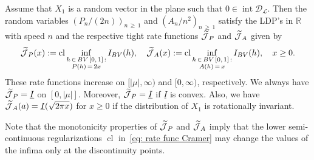 \documentclass[AHL,Unicode,published]{cedram}
\DeclareMathOperator{\cl}{cl}
\DeclareMathOperator{\intr}{int}
\newcommand{\ubar}[1]{\underline{#1}}
\newcommand{\Rbb}{\mathbb{R}}
\newcommand{\Dcl}{\mathcal{D}}
\newcommand{\Lcl}{\mathcal{L}}
\newcommand{\Jcl}{\mathcal{J}}
\let\oldtilde\tilde
\renewcommand*{\tilde}[1]{\mathchoice{\widetilde{#1}}{\widetilde{#1}}{\oldtilde{#1}}{\oldtilde{#1}}}
\begin{document}
\begin{prop}\label{prop: Cramer}
Assume that $X_1$ is a random vector in the plane such that $0 \in \intr \Dcl_{\Lcl}$. Then the random variables $(P_n/(2n))_{n\,\ge\,1}$ and $(A_n/n^2)_{n\,\ge\,1}$ satisfy the LDP's in $\Rbb$ with speed $n$ and the respective tight rate functions $\tilde{\Jcl}_P $ and $\tilde{\Jcl}_A$ given by
\begin{equation}\label{eq: rate func Cramer}
\tilde{\Jcl}_P(x):=\cl \inf_{\substack{h\,\in\,BV\,[0,\,1]\,: \\ P(h)\,=\,2x}} I_{BV}(h), \quad \tilde{\Jcl}_A(x):=\cl \inf_{\substack{h\,\in\,BV\,[0,\,1]\,: \\ A(h)\,=\,x}} I_{BV}(h), \quad x \ge 0.
\end{equation}
These rate functions increase on $[|\mu|, \infty)$ and $[0, \infty)$, respectively. We always have $\tilde{\Jcl}_P = \ubar I$ on $[0, |\mu|]$. Moreover, $\tilde{\Jcl}_P = \ubar I$ if $\ubar I$ is convex. Also, we have $\tilde{\Jcl}_A(a) = \ubar I (\sqrt{2 \pi x})$ for $x \ge 0$ if the distribution of $X_1$ is rotationally invariant.
\end{prop}

Note that the monotonicity properties of $\tilde{\Jcl}_P$ and $\tilde{\Jcl}_A$ imply that the lower semi-continuous regularizations $\cl$ in~\eqref{eq: rate func Cramer} may change the values of the infima only at the discontinuity points.
\end{document}
